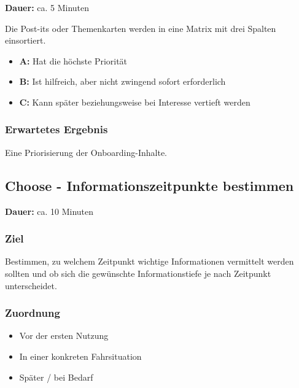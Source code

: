 \noindent
\textbf{Dauer:} ca. 5 Minuten

Die Post-its oder Themenkarten werden in eine Matrix mit drei Spalten einsortiert.

\begin{itemize}
    \item \textbf{A:} Hat die höchste Priorität
    \item \textbf{B:} Ist hilfreich, aber nicht zwingend sofort
    erforderlich
    \item \textbf{C:} Kann später beziehungsweise bei Interesse vertieft
    werden
\end{itemize}

\subsubsection*{Erwartetes Ergebnis}

Eine Priorisierung der Onboarding-Inhalte.


\clearpage

\subsection{Choose - Informationszeitpunkte bestimmen}
\label{subsec:workshop-choose-zeitpunkte}

\noindent
\textbf{Dauer:} ca. 10 Minuten

\subsubsection*{Ziel}

Bestimmen, zu welchem Zeitpunkt wichtige Informationen vermittelt werden sollten und ob sich die gewünschte Informationstiefe je nach Zeitpunkt unterscheidet.

\subsubsection*{Zuordnung}

\begin{itemize}
    \item Vor der ersten Nutzung
    \item In einer konkreten Fahrsituation
    \item Später / bei Bedarf
\end{itemize}

